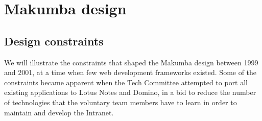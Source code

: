 \documentclass{llncs}
\begin{document}



\section{Makumba design}\label{sec:makumba}

\subsection{Design constraints}
We will illustrate the constraints that shaped the Makumba design between 1999 and 2001, at a time when few web development frameworks existed. Some of the constraints became apparent when the Tech Committee attempted to port all existing applications to Lotus Notes and Domino, in a bid to reduce the number of technologies that the voluntary team members have to learn in order to maintain and develop the Intranet.
\end{document}
